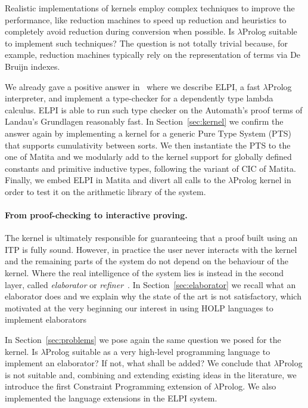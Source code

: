 \documentclass{easychair}
\begin{document}
Realistic implementations of kernels employ complex techniques to improve the performance, like reduction machines to speed up reduction and heuristics to completely avoid reduction during conversion when possible. Is $\lambda$Prolog suitable to implement such techniques? The question is not totally trivial because, for example, reduction machines typically rely on the representation of terms via De Bruijn indexes.

We already gave a positive answer in~\cite{elpiLPAR} where we describe
ELPI, a fast $\lambda$Prolog interpreter, and implement 
a type-checker for a dependently type lambda calculus.
ELPI is able to run such type checker on the Automath's proof terms of
Landau's Grundlagen reasonably fast.
In Section~\ref{sec:kernel} we confirm the answer again by implementing a
kernel for a generic Pure Type System (PTS) that supports cumulativity between
sorts. We then instantiate the PTS to the one of Matita and we
modularly add to the kernel support for globally defined constants and
primitive inductive types, following the variant of CIC of Matita. Finally, we embed ELPI in Matita and divert all calls
to the $\lambda$Prolog kernel in order to test it on the arithmetic
library of the system.

\paragraph{From proof-checking to interactive proving.}

The kernel is ultimately responsible for guaranteeing that a proof
built using an ITP is fully sound. However, in practice the user never
interacts with the kernel and the remaining parts of the system do not
depend on the behaviour of the kernel. Where the real intelligence of
the system lies is instead in the second layer, called \emph{elaborator}
or \emph{refiner}~\cite{Lean,bidir}.
In Section~\ref{sec:elaborator} we recall what an elaborator does and we explain why the state of the art is not satisfactory, which motivated at the very beginning our interest in using HOLP languages to implement elaborators

In Section~\ref{sec:problems} we pose again the same question we posed for the kernel. Is $\lambda$Prolog suitable as a very high-level programming language to implement an elaborator? If not, what shall be added? We conclude that $\lambda$Prolog is not suitable and, combining and extending existing ideas in the literature, we introduce the first Constraint Programming extension of $\lambda$Prolog. We also implemented the language extensions in the ELPI system.
\end{document}
